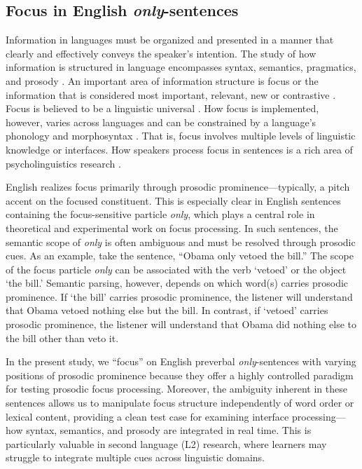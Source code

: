 \subsection{Focus in English \textit{only}-sentences}

Information in languages must be organized and presented in a manner that clearly and effectively conveys the speaker's intention. The study of how information is structured in language encompasses syntax, semantics, pragmatics, and prosody \parencite[see][] {Breen2010, Lambrecht1994, Roberts2012}. An important area of information structure is focus or the information that is considered most important, relevant, new or contrastive \parencite{Kiss1998}. Focus is believed to be a linguistic universal \parencite{Comrie1989}. How focus is implemented, however, varies across languages and can be constrained by a language’s phonology and morphosyntax \parencite{Kiss1998, Lambrecht1994}. That is, focus involves multiple levels of linguistic knowledge or interfaces. How speakers process focus in sentences is a rich area of psycholinguistics research \parencite[e.g.,][] {Cutler1979, Filik2005, Wang2011}. 

English realizes focus primarily through prosodic prominence—typically, a pitch accent on the focused constituent. This is especially clear in English sentences containing the focus-sensitive particle \textit{only}, which plays a central role in theoretical and experimental work on focus processing. In such sentences, the semantic scope of \textit{only} is often ambiguous and must be resolved through prosodic cues. As an example, take the sentence, “Obama only vetoed the bill.” The scope of the focus particle \textit{only} can be associated with the verb ‘vetoed’ or the object ‘the bill.’ Semantic parsing, however, depends on which word(s) carries prosodic prominence. If ‘the bill’ carries prosodic prominence, the listener will understand that Obama vetoed nothing else but the bill. In contrast, if ‘vetoed’ carries prosodic prominence, the listener will understand that Obama did nothing else to the bill other than veto it.

In the present study, we “focus” on English preverbal \textit{only}-sentences with varying positions of prosodic prominence because they offer a highly controlled paradigm for testing prosodic focus processing. Moreover, the ambiguity inherent in these sentences allows us to manipulate focus structure independently of word order or lexical content, providing a clean test case for examining interface processing—how syntax, semantics, and prosody are integrated in real time. This is particularly valuable in second language (L2) research, where learners may struggle to integrate multiple cues across linguistic domains.

